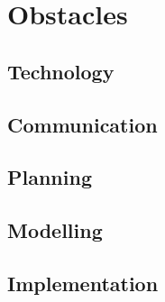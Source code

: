 \section{Obstacles}

\subsection{Technology}

\subsection{Communication}

\subsection{Planning}

\subsection{Modelling}

\subsection{Implementation}